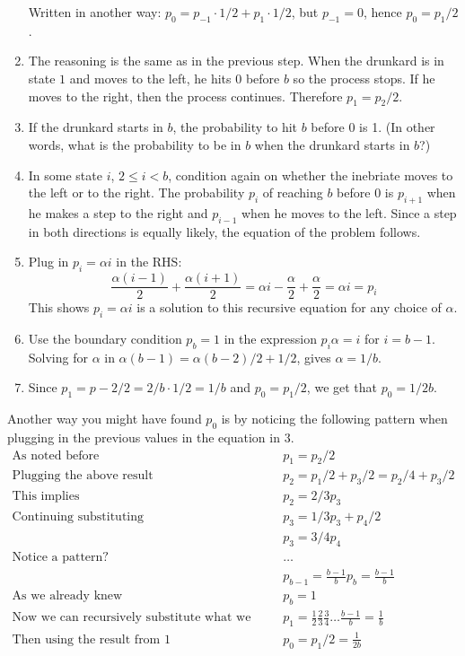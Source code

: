 \begin{exercise}
\begin{solution}
\begin{enumerate}
    Written in another way: $p_0=p_{-1}\cdot 1/2 + p_1\cdot 1/2$, but $p_{-1}=0$, hence $p_0=p_1/2$.
    \item The reasoning is the same as in the  previous step. When the drunkard is in state $1$ and moves to the left, he hits 0 before $b$ so the process stops. If he moves to the right, then the process continues. Therefore $p_1=p_2/2$.
    \item If the drunkard starts in $b$, the probability to hit $b$ before $0$ is 1. (In other words, what is the probability to be in $b$ when the drunkard starts in $b$?)
    \item In some state $i$, $2\leq i < b$, condition again on whether the inebriate moves to the left or to the right.  The probability $p_{i}$ of reaching $b$ before 0 is $p_{i+1}$ when he makes a step to the right and $p_{i-1}$ when he moves to the left.  Since a step in both directions is equally likely, the equation of the problem follows.
    \item Plug in $p_i = \alpha i$ in the RHS:
      \begin{equation*}
    \frac{\alpha(i-1)}{2} + \frac{\alpha(i+1)}{2} = \alpha i - \frac{\alpha}{2} + \frac{\alpha}{2} = \alpha i = p_i
      \end{equation*}
    This shows $p_i = \alpha i$ is a solution to this recursive equation for any choice of $\alpha$.
    \item Use the boundary condition $ p_b = 1$ in the expression $p_{i}\alpha = i$ for $i=b-1$. Solving for $\alpha$ in $\alpha(b-1) = \alpha(b-2)/2+1/2$,      gives $\alpha=1/b$.
    \item Since $p_1=p-2/2 = 2/b\cdot 1/2 = 1/b$ and $p_0 = p_1 / 2$, we get that $p_{0}=1/2b$.  \end{enumerate}

  Another way you might have found $p_0$ is by noticing the following pattern when plugging in the previous values in the equation in $3$.
\begin{align*}
\textrm{As noted before } \quad & p_1 = p_2/2 \\
\textrm{Plugging the above result } \quad & p_2 = p_1/2 + p_3/2 = p_2/4 + p_3/2 \\
  \textrm{This implies } \quad & p_2 = 2/3 p_3 \\
  \textrm{Continuing substituting } \quad & p_3 = 1/3 p_3 + p_4 / 2\\
  & p_3 = 3/4 p_4 \\
  \textrm{Notice a pattern? } \quad & \dots \\
  & p_{b-1} = \frac{b-1}{b} p_b = \frac{b-1}{b}\\
  \textrm{As we already knew} \quad & p_b = 1 \\
\textrm{Now we can recursively substitute what we know to find } \quad & p_1 = \frac{1}{2} \frac{2}{3} \frac{3}{4} \dots \frac{b-1}{b} = \frac{1}{b} \\
\textrm{Then using the result from $1$} \quad & p_0 = p_1/2 = \frac{1}{2b}
\end{align*}
\end{solution}
\end{exercise}



